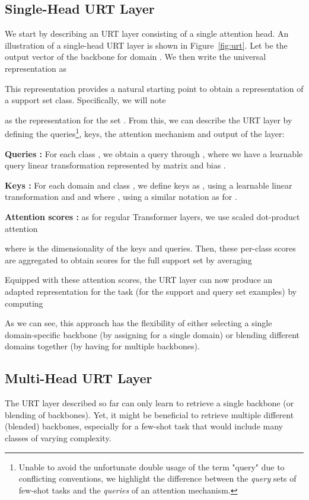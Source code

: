 \documentclass{article}
\begin{document}
\subsection{Single-Head URT Layer}

We start by describing an URT layer consisting of a single attention head. An illustration of a single-head URT layer is shown in Figure~\ref{fig:urt}.
Let  be the output vector of the backbone for domain . We then write the universal representation as

This representation provides a natural starting point to obtain a representation of a support set class. Specifically, we will note

as the representation for the set .
From this, we can describe the URT layer by defining the queries\footnote{Unable to avoid the unfortunate double usage of the term "query" due to conflicting conventions, we highlight the difference between the {\it query} sets  of few-shot tasks and the {\it queries}  of an attention mechanism.}, keys, the attention mechanism and output of the layer:

{\bf Queries :} For each class , we obtain a query through , where we have a learnable query linear transformation represented by matrix  and bias .
    
{\bf Keys :} For each domain  and class , we define keys as , using a learnable linear transformation  and  and where , using a similar notation as for .


{\bf Attention scores :} as for regular Transformer layers, we use scaled dot-product attention

where  is the dimensionality of the keys and queries. Then, these per-class scores are aggregated to obtain scores for the full support set by averaging


Equipped with these attention scores, the URT layer can now produce an adapted representation for the task (for the support and query set examples) by computing

As we can see, this approach has the flexibility of either selecting a single domain-specific backbone (by assigning  for a single domain) or blending different domains together (by having  for multiple backbones).

\subsection{Multi-Head URT Layer}
The URT layer described so far can only learn to retrieve a single backbone (or blending of backbones). Yet, it might be beneficial to retrieve multiple different (blended) backbones, especially for a few-shot task that would include many classes of varying complexity.
\end{document}
